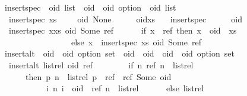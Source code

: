 \begin{isabelle}
\isamarkupfalse%
\ insert{\isacharunderscore}spec\ {\isacharcolon}{\isacharcolon}\ {\isachardoublequoteopen}{\isacharprime}oid\ list\ {\isasymRightarrow}\ {\isacharparenleft}{\isacharprime}oid\ {\isasymtimes}\ {\isacharprime}oid\ option{\isacharparenright}\ {\isasymRightarrow}\ {\isacharprime}oid\ list{\isachardoublequoteclose}\isanewline
{}\isanewline
\ \ {\isachardoublequoteopen}insert{\isacharunderscore}spec\ xs\ \ \ \ \ {\isacharparenleft}oid{\isacharcomma}\ None{\isacharparenright}\ \ \ \ \ {\isacharequal}\ oid{\isacharhash}xs{\isachardoublequoteclose}\ {\isacharbar}\isanewline
\ \ {\isachardoublequoteopen}insert{\isacharunderscore}spec\ {\isacharbrackleft}{\isacharbrackright}\ \ \ \ \ {\isacharparenleft}oid{\isacharcomma}\ {\isacharunderscore}{\isacharparenright}\ \ \ \ \ \ \ \ {\isacharequal}\ {\isacharbrackleft}{\isacharbrackright}{\isachardoublequoteclose}\ {\isacharbar}\isanewline
\ \ {\isachardoublequoteopen}insert{\isacharunderscore}spec\ {\isacharparenleft}x{\isacharhash}xs{\isacharparenright}\ {\isacharparenleft}oid{\isacharcomma}\ Some\ ref{\isacharparenright}\ {\isacharequal}\isanewline
\ \ \ \ \ {\isacharparenleft}if\ x\ {\isacharequal}\ ref\ then\ x\ {\isacharhash}\ oid\ {\isacharhash}\ xs\isanewline
\ \ \ \ \ \ \ \ \ \ \ \ \ \ \ \ \ else\ x\ {\isacharhash}\ {\isacharparenleft}insert{\isacharunderscore}spec\ xs\ {\isacharparenleft}oid{\isacharcomma}\ Some\ ref{\isacharparenright}{\isacharparenright}{\isacharparenright}{\isachardoublequoteclose}\isanewline
\isanewline
{}\isamarkupfalse%
\ insert{\isacharunderscore}alt\ {\isacharcolon}{\isacharcolon}\ {\isachardoublequoteopen}{\isacharparenleft}{\isacharprime}oid\ {\isasymtimes}\ {\isacharprime}oid\ option{\isacharparenright}\ set\ {\isasymRightarrow}\ {\isacharparenleft}{\isacharprime}oid\ {\isasymtimes}\ {\isacharprime}oid{\isacharparenright}\ {\isasymRightarrow}\ {\isacharparenleft}{\isacharprime}oid\ {\isasymtimes}\ {\isacharprime}oid\ option{\isacharparenright}\ set{\isachardoublequoteclose}\isanewline
{}\isanewline
\ \ {\isachardoublequoteopen}insert{\isacharunderscore}alt\ list{\isacharunderscore}rel\ {\isacharparenleft}oid{\isacharcomma}\ ref{\isacharparenright}\ {\isacharequal}\ {\isacharparenleft}\isanewline
\ \ \ \ \ \ if\ {\isasymexists}n{\isachardot}\ {\isacharparenleft}ref{\isacharcomma}\ n{\isacharparenright}\ {\isasymin}\ list{\isacharunderscore}rel\isanewline
\ \ \ \ \ \ then\ {\isacharbraceleft}{\isacharparenleft}p{\isacharcomma}\ n{\isacharparenright}\ {\isasymin}\ list{\isacharunderscore}rel{\isachardot}\ p\ {\isasymnoteq}\ ref{\isacharbraceright}\ {\isasymunion}\ {\isacharbraceleft}{\isacharparenleft}ref{\isacharcomma}\ Some\ oid{\isacharparenright}{\isacharbraceright}\ {\isasymunion}\isanewline
\ \ \ \ \ \ \ \ \ \ \ {\isacharbraceleft}{\isacharparenleft}i{\isacharcomma}\ n{\isacharparenright}{\isachardot}\ i\ {\isacharequal}\ oid\ {\isasymand}\ {\isacharparenleft}ref{\isacharcomma}\ n{\isacharparenright}\ {\isasymin}\ list{\isacharunderscore}rel{\isacharbraceright}\isanewline
\ \ \ \ \ \ else\ list{\isacharunderscore}rel{\isacharparenright}{\isachardoublequoteclose}%
\end{isabelle}


